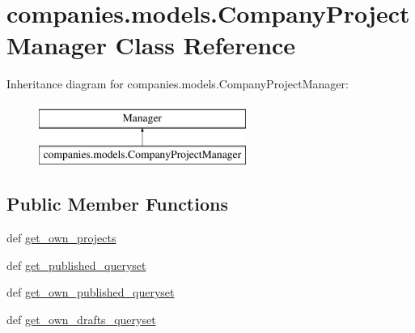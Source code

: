 \hypertarget{classcompanies_1_1models_1_1_company_project_manager}{\section{companies.\-models.\-Company\-Project\-Manager Class Reference}
\label{classcompanies_1_1models_1_1_company_project_manager}
}
Inheritance diagram for companies.\-models.\-Company\-Project\-Manager\-:\begin{figure}[H]
\begin{center}
\leavevmode
\includegraphics[height=2.000000cm]{classcompanies_1_1models_1_1_company_project_manager}
\end{center}
\end{figure}
\subsection*{Public Member Functions}
\begin{DoxyCompactItemize}
\item 
def \hyperlink{classcompanies_1_1models_1_1_company_project_manager_adda9e0efb854de4ddab880d2d4943bc2}{get\-\_\-own\-\_\-projects}
\item 
def \hyperlink{classcompanies_1_1models_1_1_company_project_manager_a476241e6b460ba61915dd2c767914f33}{get\-\_\-published\-\_\-queryset}
\item 
def \hyperlink{classcompanies_1_1models_1_1_company_project_manager_a8a37c0ce5c8d022d7f30e97e69a5d03c}{get\-\_\-own\-\_\-published\-\_\-queryset}
\item 
def \hyperlink{classcompanies_1_1models_1_1_company_project_manager_ac0eee0637123f2c81031a78ab3e0043d}{get\-\_\-own\-\_\-drafts\-\_\-queryset}
\end{DoxyCompactItemize}


